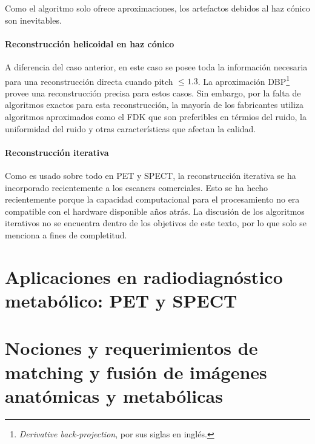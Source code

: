 Como el algoritmo solo ofrece aproximaciones, los artefactos debidos al haz
c{\'o}nico son inevitables.

\paragraph{Reconstrucci{\'o}n helicoidal en haz c{\'o}nico}

A diferencia del caso anterior, en este caso se posee toda la informaci{\'o}n
necesaria para una reconstrucci{\'o}n directa cuando pitch $\leq 1.3$. La
aproximaci{\'o}n DBP\footnote{{\emph{Derivative back-projection}}, por sus
siglas en ingl{\'e}s.} provee una reconstrucci{\'o}n precisa para estos casos.
Sin embargo, por la falta de algoritmos exactos para esta reconstrucci{\'o}n,
la mayor{\'i}a de los fabricantes utiliza algoritmos aproximados como el FDK
que son preferibles en t{\'e}rmios del ruido, la uniformidad del ruido y otras
caracter{\'i}sticas que afectan la calidad.

\paragraph{Reconstrucci{\'o}n iterativa}

Como es usado sobre todo en PET y SPECT, la reconstrucci{\'o}n iterativa se ha
incorporado recientemente a los escaners comerciales. Esto se ha hecho
recientemente porque la capacidad computacional para el procesamiento no era
compatible con el hardware disponible a{\~n}os atr{\'a}s. La discusi{\'o}n de
los algoritmos iterativos no se encuentra dentro de los objetivos de este
texto, por lo que solo se menciona a fines de completitud.


\section{Aplicaciones en radiodiagn\'ostico metab\'olico: PET y SPECT}

\section{Nociones y requerimientos de matching y fusi\'on de im\'agenes anat\'omicas y metab\'olicas}
